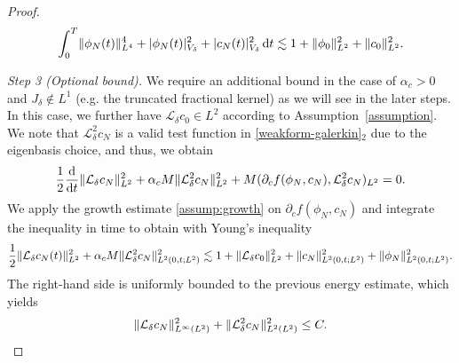 \documentclass[]{article}
\newcommand{\dt}{\,\textup{d}t}
\newcommand{\ddt}{\frac{\textup{d}}{\textup{d}t}}
\DeclarePairedDelimiter{\abs}{\lvert}{\rvert}
\DeclarePairedDelimiter{\norm}{\lVert}{\rVert}
\begin{document}
\begin{proof}
	\begin{equation}
		\label{X-bound}   \int_{0}^{T}\norm{\phi_N(t)}_{L^4}^{4}+\abs{\phi_N(t)}_{V_\delta}^{2}+\abs{c_N(t)}_{V_\delta}^{2} \dt
		\lesssim 1+\norm{\phi_0}_{L^{2}}^{2}+\norm{c_0}_{L^{2}}^{2}.
	\end{equation}
	
	
	\noindent\emph{Step 3 (Optional bound).} We require an additional bound in the case of $\alpha_c>0$ and $J_\delta \notin L^1$ (e.g. the truncated fractional kernel) as we will see in the later steps. In this case, we further have $\mathcal{L}_\delta c_0 \in L^2$ according to Assumption~\ref{assumption}. We note that $\mathcal{L}_\delta^2 c_N$ is a valid test function in \eqref{weakform-galerkin}$_2$ due to the eigenbasis choice, and thus, we obtain
	$$\frac12 \ddt \norm{\mathcal{L}_\delta c_N}_{L^2}^2 + \alpha_c M \norm{\mathcal{L}_\delta^2 c_N}_{L^2}^2 + M(\partial_c f(\phi_N,c_N),\mathcal{L}_\delta^2 c_N)_{L^2}=0.$$
	We apply the growth estimate \eqref{assump:growth} on $\partial_c f(\phi_N,c_N)$ and integrate the inequality in time to obtain with Young's inequality
	$$\frac12 \norm{\mathcal{L}_\delta c_N(t)}_{L^2}^2 + \alpha_c M \norm{\mathcal{L}_\delta^2 c_N}_{L^2(0,t;L^2)}^2 \lesssim 1+\norm{\mathcal{L}_\delta c_0}_{L^2}^2+\norm{c_N}_{L^2(0,t;L^2)}^2+\norm{\phi_N}_{L^2(0,t;L^2)}^2.$$
	The right-hand side is uniformly bounded to the previous energy estimate, which yields 
	\begin{equation}\label{Eq:Optional} \norm{\mathcal{L}_\delta c_N}_{L^\infty(L^2)}^2 +  \norm{\mathcal{L}_\delta^2 c_N}_{L^2(L^2)}^2 \leq C.
	\end{equation}
	

\end{proof}
\end{document}
